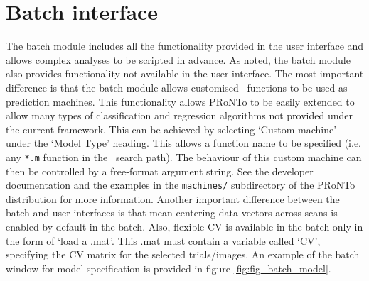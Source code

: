 

\section{Batch interface}

The batch module includes all the functionality provided in the user interface and allows complex analyses to be scripted in advance. As noted, the batch module also provides functionality not available in the user interface. The most important difference is that the batch module allows customised \matlab{} \ functions to be used as prediction machines. This functionality allows PRoNTo to be easily extended to allow many types of classification and regression algorithms not provided under the current framework. This can be achieved by selecting `Custom machine' under the `Model Type' heading. This allows a function name to be specified (i.e. any \texttt{*.m} function in the \matlab{} \ search path). The behaviour of this custom machine can then be controlled by a free-format argument string. See the developer documentation and the examples in the \texttt{machines/} subdirectory of the PRoNTo distribution for more information. Another important difference between the batch and user interfaces is that mean centering data vectors across scans is enabled by default in the batch. Also, flexible CV is available in the batch only in the form of `load a .mat'. This .mat must contain a variable called `CV', specifying the CV matrix for the selected trials/images. An example of the batch window for model specification is provided in figure \ref{fig:fig_batch_model}.



